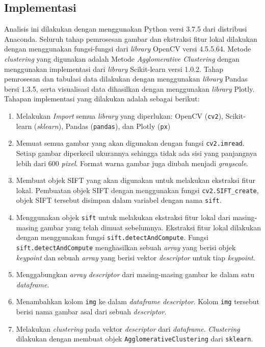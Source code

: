 \subsection{Implementasi}
Analisis ini dilakukan dengan menggunakan Python versi 3.7.5 dari distribusi Anaconda. Seluruh tahap pemrosesan gambar dan ekstraksi fitur lokal dilakukan dengan menggunakan fungsi-fungsi dari \textit{library} OpenCV versi 4.5.5.64. Metode \textit{clustering} yang digunakan adalah Metode \textit{Agglomerative Clustering} dengan menggunakan implementasi dari \textit{library} Scikit-learn versi 1.0.2. Tahap pemrosesan dan tabulasi data dilakukan dengan menggunakan \textit{library} Pandas bersi 1.3.5, serta visualisasi data dihasilkan dengan menggunakan \textit{library} Plotly. Tahapan implementasi yang dilakukan adalah sebagai berikut:
\begin{enumerate}
	\item Melakukan \textit{Import} semua \textit{library} yang diperlukan: OpenCV (\texttt{cv2}), Scikit-learn (\textit{sklearn}), Pandas (\texttt{pandas}), dan Plotly (\texttt{px})
	\item Memuat semua gambar yang akan digunakan dengan fungsi \texttt{cv2.imread}. Setiap gambar diperkecil ukurannya sehingga tidak ada sisi yang panjangnya lebih dari 600 \textit{pixel}. Format warna gambar juga diubah menjadi \textit{grayscale}.
	\item Membuat objek SIFT yang akan digunakan untuk melakukan ekstraksi fitur lokal. Pembuatan objek SIFT dengan menggunakan fungsi \texttt{cv2.SIFT\_create}, objek SIFT tersebut disimpan dalam variabel dengan nama \texttt{sift}.
	\item Menggunakan objek \texttt{sift} untuk melakukan ekstraksi fitur lokal dari masing-masing gambar yang telah dimuat sebelumnya. Ekstraksi fitur lokal dilakukan dengan menggunakan fungsi \texttt{sift.detectAndCompute}. Fungsi \texttt{sift.detectAndCompute} menghasilkan sebuah \textit{array} yang berisi objek \textit{keypoint} dan sebuah \textit{array} yang berisi vektor \textit{descriptor} untuk tiap \textit{keypoint}. 
	\item Menggabungkan \textit{array} \textit{descriptor} dari masing-masing gambar ke dalam satu \textit{dataframe}.
	\item Menambahkan kolom \texttt{img} ke dalam \textit{dataframe} \textit{descriptor}. Kolom \texttt{img} tersebut berisi nama gambar asal dari sebuah \textit{descriptor}.
	\item Melakukan \textit{clustering} pada vektor \textit{descriptor} dari \textit{dataframe}. \textit{Clustering} dilakukan dengan membuat objek \texttt{AgglomerativeClustering} dari \texttt{sklearn}. 

\end{enumerate}
